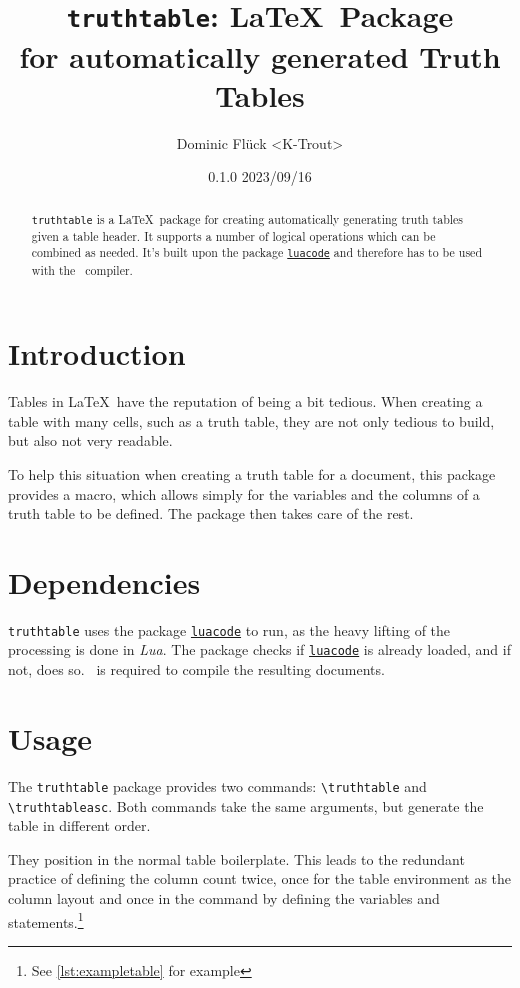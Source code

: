 \documentclass[a4paper]{article}
\title{\texttt{truthtable}\textbf{: \LaTeX\ Package\\for automatically generated Truth Tables}}
\author{Dominic Flück <K-Trout>}
\date{0.1.0 2023/09/16}
\begin{document}
\maketitle

\begin{abstract}
    \noindent \texttt{truthtable} is a \LaTeX\ package for creating automatically generating truth tables given a table header. It supports a number of logical operations which can be combined as needed. It's built upon the package \href{https://ctan.org/pkg/luacode}{\texttt{luacode}} and therefore has to be used with the \LuaLaTeX\ compiler.
\end{abstract}

\tableofcontents

\section{Introduction}
Tables in \LaTeX\ have the reputation of being a bit tedious. When creating a table with many cells, such as a truth table, they are not only tedious to build, but also not very readable.

To help this situation when creating a truth table for a document, this package provides a macro, which allows simply for the variables and the columns of a truth table to be defined. The package then takes care of the rest.

\section{Dependencies}

\texttt{truthtable} uses the package \href{https://ctan.org/pkg/luacode}{\texttt{luacode}} to run, as the heavy lifting of the processing is done in \emph{Lua}. 	The package checks if \href{https://ctan.org/pkg/luacode}{\texttt{luacode}} is already loaded, and if not, does so. \LuaLaTeX\ is required to compile the resulting documents.

\section{Usage}

The \texttt{truthtable} package provides two commands: \texttt{\textbackslash truthtable} and \texttt{\textbackslash truthtableasc}. Both commands take the same arguments, but generate the table in different order.

They position in the normal table boilerplate. This leads to the redundant practice of defining the column count twice, once for the table environment as the column layout and once in the command by defining the variables and statements.\footnote{See \autoref{lst:exampletable} for example}
\end{document}
